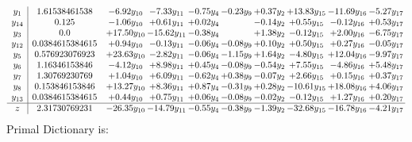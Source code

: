 \documentclass[9pt]{article}
\begin{document}
\[\begin{array}{c| c c@{\hskip 2pt} c@{\hskip 2pt} c@{\hskip 2pt} c@{\hskip 2pt} c@{\hskip 2pt} c@{\hskip 2pt} c@{\hskip 2pt} c@{\hskip 2pt} }
 y_{1}   &  1.61538461538 & -6.92 y_{10} & -7.33 y_{11} & -0.75 y_{4} & -0.23 y_{9} & +  0.37 y_{2} & + 13.83 y_{15} & -11.69 y_{16} & -5.27 y_{17}\\
 y_{14}   &  0.125 & -1.06 y_{10} & +  0.61 y_{11} & +  0.02 y_{4} &   & -0.14 y_{2} & +  0.55 y_{15} & -0.12 y_{16} & +  0.53 y_{17}\\
 y_{3}   &  0.0 & + 17.50 y_{10} & -15.62 y_{11} & -0.38 y_{4} &   & +  1.38 y_{2} & -0.12 y_{15} & +  2.00 y_{16} & -6.75 y_{17}\\
 y_{12}   &  0.0384615384615 & +  0.94 y_{10} & -0.13 y_{11} & -0.06 y_{4} & -0.08 y_{9} & +  0.10 y_{2} & +  0.50 y_{15} & +  0.27 y_{16} & -0.05 y_{17}\\
 y_{5}   &  0.576923076923 & + 23.63 y_{10} & -2.82 y_{11} & -0.06 y_{4} & -1.15 y_{9} & +  1.64 y_{2} & -4.80 y_{15} & + 12.04 y_{16} & -9.97 y_{17}\\
 y_{6}   &  1.16346153846 & -4.12 y_{10} & +  8.98 y_{11} & +  0.45 y_{4} & -0.08 y_{9} & -0.54 y_{2} & +  7.55 y_{15} & -4.86 y_{16} & +  5.48 y_{17}\\
 y_{7}   &  1.30769230769 & +  1.04 y_{10} & +  6.09 y_{11} & -0.62 y_{4} & +  0.38 y_{9} & -0.07 y_{2} & +  2.66 y_{15} & +  0.15 y_{16} & +  0.37 y_{17}\\
 y_{8}   &  0.153846153846 & + 13.27 y_{10} & +  8.36 y_{11} & +  0.87 y_{4} & -0.31 y_{9} & +  0.28 y_{2} & -10.61 y_{15} & + 18.08 y_{16} & +  4.06 y_{17}\\
 y_{13}   &  0.0384615384615 & +  0.44 y_{10} & +  0.75 y_{11} & +  0.06 y_{4} & -0.08 y_{9} & -0.02 y_{2} & -0.12 y_{15} & +  1.27 y_{16} & +  0.20 y_{17}\\
\hline
z    &  2.31730769231 & -26.35 y_{10} & -14.79 y_{11} & -0.55 y_{4} & -0.38 y_{9} & -1.39 y_{2} & -32.68 y_{15} & -16.78 y_{16} & -4.21 y_{17}\\
\end{array}\]
Primal Dictionary is:
\end{document}
